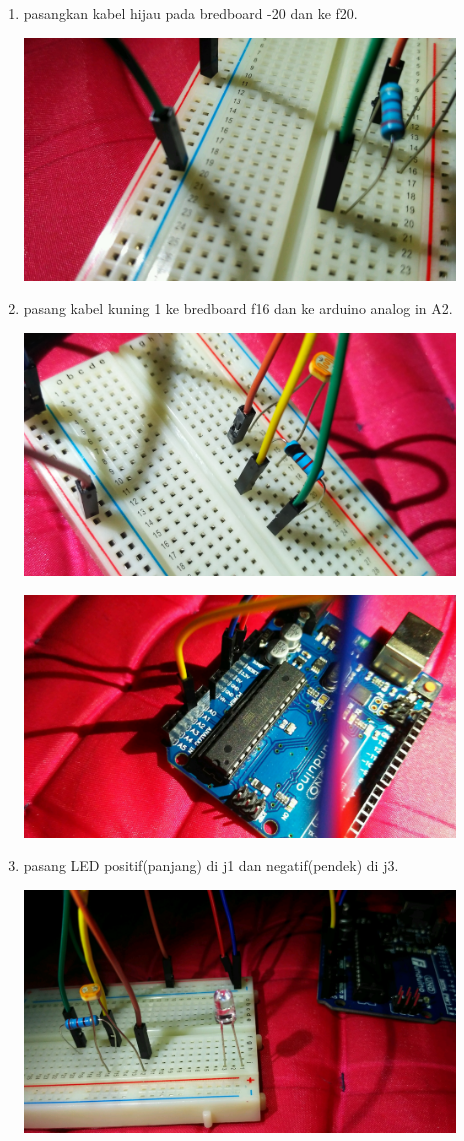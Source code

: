 \documentclass{article}
\begin{document}
\begin{enumerate}
	\item pasangkan kabel hijau pada bredboard -20 dan ke f20.
	\break
	\centerline{\includegraphics[width=0.9\textwidth]{figures/9.jpg}}
	\break
	\item pasang kabel kuning 1 ke bredboard f16 dan ke arduino analog in A2.
	\break
	\centerline{\includegraphics[width=0.9\textwidth]{figures/10.jpg}}
	\break
	\centerline{\includegraphics[width=0.9\textwidth]{figures/11.jpg}}
	\break
	\item pasang LED positif(panjang) di j1 dan negatif(pendek) di j3.
	\break
	\centerline{\includegraphics[width=0.9\textwidth]{figures/12.jpg}}

\end{enumerate}
\end{document}
